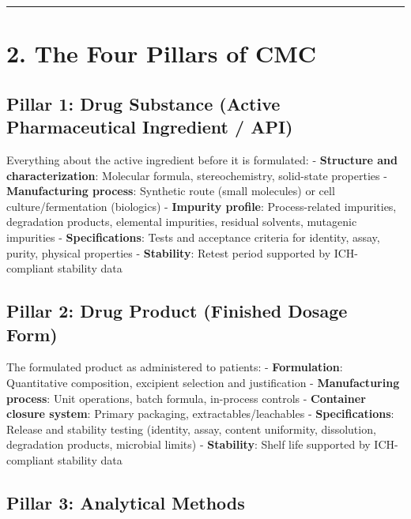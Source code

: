 \documentclass[
  11pt,
  a4paper,
]{report}
\begin{document}
\begin{center}\rule{0.5\linewidth}{0.5pt}\end{center}

\hypertarget{the-four-pillars-of-cmc}{%
\section{2. The Four Pillars of CMC}\label{the-four-pillars-of-cmc}}

\hypertarget{pillar-1-drug-substance-active-pharmaceutical-ingredient-api}{%
\subsection{Pillar 1: Drug Substance (Active Pharmaceutical Ingredient /
API)}\label{pillar-1-drug-substance-active-pharmaceutical-ingredient-api}}

Everything about the active ingredient before it is formulated: -
\textbf{Structure and characterization}: Molecular formula,
stereochemistry, solid-state properties - \textbf{Manufacturing
process}: Synthetic route (small molecules) or cell culture/fermentation
(biologics) - \textbf{Impurity profile}: Process-related impurities,
degradation products, elemental impurities, residual solvents, mutagenic
impurities - \textbf{Specifications}: Tests and acceptance criteria for
identity, assay, purity, physical properties - \textbf{Stability}:
Retest period supported by ICH-compliant stability data

\hypertarget{pillar-2-drug-product-finished-dosage-form}{%
\subsection{Pillar 2: Drug Product (Finished Dosage
Form)}\label{pillar-2-drug-product-finished-dosage-form}}

The formulated product as administered to patients: -
\textbf{Formulation}: Quantitative composition, excipient selection and
justification - \textbf{Manufacturing process}: Unit operations, batch
formula, in-process controls - \textbf{Container closure system}:
Primary packaging, extractables/leachables - \textbf{Specifications}:
Release and stability testing (identity, assay, content uniformity,
dissolution, degradation products, microbial limits) -
\textbf{Stability}: Shelf life supported by ICH-compliant stability data

\hypertarget{pillar-3-analytical-methods}{%
\subsection{Pillar 3: Analytical
Methods}\label{pillar-3-analytical-methods}}
\end{document}
